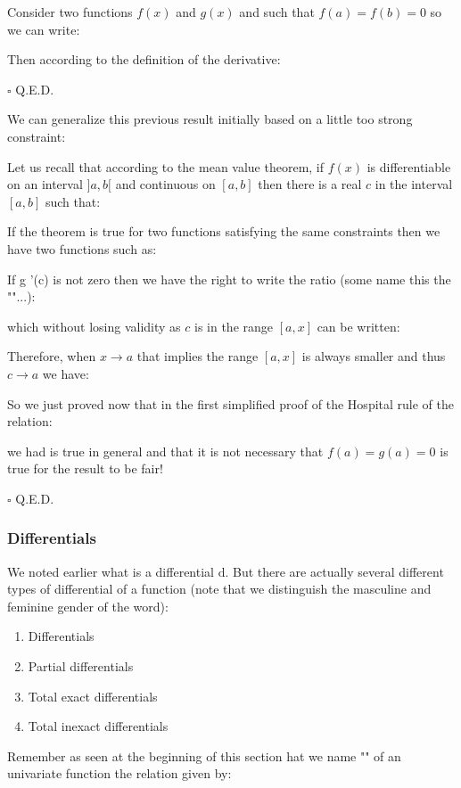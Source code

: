 	\begin{dem}
		Consider two functions $f(x)$ and $g(x)$ and such that $f(a)=f(b)=0$ so we can write:
		
		Then according to the definition of the derivative:
		
		\begin{flushright}
			$\square$  Q.E.D.
		\end{flushright}		
	\end{dem}
We can generalize this previous result initially based on a little too strong constraint:
	
	\begin{dem}
Let us recall that according to the mean value theorem, if $f(x)$ is differentiable on an interval $]a, b[$ and continuous on $[a, b]$ then there is a real $c$ in the interval $[a, b]$ such that:
		
		If the theorem is true for two functions satisfying the same constraints then we have two functions such as:
		
				If g '(c) is not zero then we have the right to write the ratio (some name this the "\index{generalized mean value theorem}"...):	
		
		which without losing validity as $c$ is in the range $[a, x]$ can be written:
		
		Therefore, when $x \rightarrow a$ that implies the range $[a, x]$ is always smaller and thus $c \rightarrow a$ we have:
		
		So we just proved now that in the first simplified proof of the Hospital rule of the relation:
		
		we had is true in general and that it is not necessary that $f(a)=g(a)=0$ is true for the result to be fair!
		\begin{flushright}
			$\square$  Q.E.D.
		\end{flushright}
	\end{dem}
	
	\pagebreak
	\subsubsection{Differentials}
	
	We noted earlier what is a differential $\mathrm{d}$. But there are actually several different types of differential of a function (note that we distinguish the masculine and feminine gender of the word):
	\begin{enumerate}
		\item Differentials
		\item Partial differentials
		\item Total exact differentials
		\item Total inexact differentials
	\end{enumerate}
		Remember as seen at the beginning of this section hat we name  "" of an univariate function the relation given by:
	
